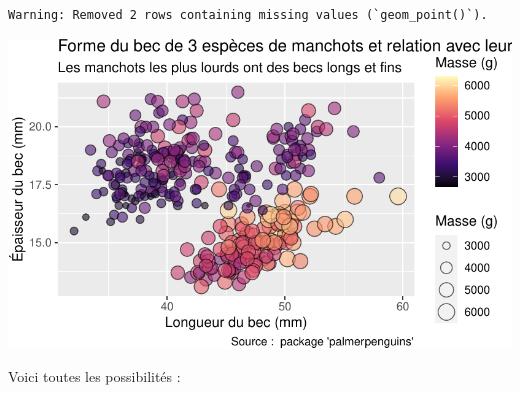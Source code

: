 \documentclass[
  a4paper,
  DIV=11,
  numbers=noendperiod,
  oneside]{scrreprt}
\begin{document}
\begin{verbatim}
Warning: Removed 2 rows containing missing values (`geom_point()`).
\end{verbatim}

\includegraphics{03-visualization_files/figure-pdf/unnamed-chunk-92-1.pdf}

Voici toutes les possibilités :
\end{document}
